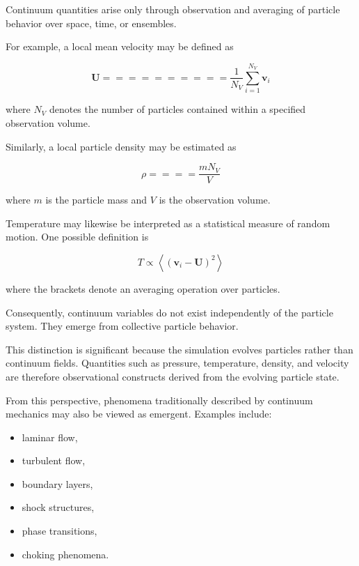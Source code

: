 Continuum quantities arise only through observation and averaging of particle behavior over space, time, or ensembles.

For example, a local mean velocity may be defined as

\begin{equation}
\mathbf{U}
==========
\frac{1}{N_V}
\sum_{i=1}^{N_V}
\mathbf{v}_i
\label{eq:mean_velocity}
\end{equation}

where $N_V$ denotes the number of particles contained within a specified observation volume.

Similarly, a local particle density may be estimated as

\begin{equation}
\rho
====
\frac{mN_V}{V}
\label{eq:density}
\end{equation}

where $m$ is the particle mass and $V$ is the observation volume.

Temperature may likewise be interpreted as a statistical measure of random motion. One possible definition is

\begin{equation}
T
\propto
\left<
\left(
\mathbf{v}_i-\mathbf{U}
\right)^2
\right>
\label{eq:temperature}
\end{equation}

where the brackets denote an averaging operation over particles.

Consequently, continuum variables do not exist independently of the particle system. They emerge from collective particle behavior.

This distinction is significant because the simulation evolves particles rather than continuum fields. Quantities such as pressure, temperature, density, and velocity are therefore observational constructs derived from the evolving particle state.

From this perspective, phenomena traditionally described by continuum mechanics may also be viewed as emergent. Examples include:

\begin{itemize}
\item laminar flow,
\item turbulent flow,
\item boundary layers,
\item shock structures,
\item phase transitions,
\item choking phenomena.
\end{itemize}

